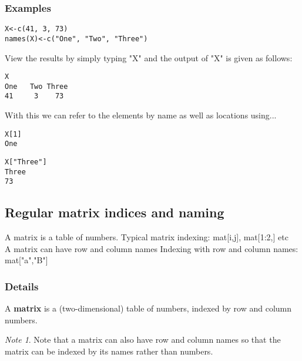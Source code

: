 \documentclass[12pt,a4paper]{article}
\theoremstyle{regla}
\theoremstyle{remark}
\newtheorem{notes}{Note}[section]
\theoremstyle{definition}
\theoremstyle{nonumberbreak}
\begin{document}
\subsubsection{Examples}
\begin{xmpl}
\begin{lstlisting}
X<-c(41, 3, 73)
names(X)<-c("One", "Two", "Three")
\end{lstlisting}

View the results by simply typing "X" and the output of "X" is given as follows:

\begin{lstlisting}
X
One   Two Three 
41     3    73
\end{lstlisting}

With this we can refer to the elements by name as well as locations using...

\begin{lstlisting}
X[1] 
One  
\end{lstlisting}

\begin{lstlisting}
X["Three"] 
Three  
73 
\end{lstlisting}

\end{xmpl}



\subsection{Regular matrix indices and naming}
\begin{fbox}
\begin{minipage}{0.97\textwidth}
A matrix is a table of numbers. 
Typical matrix indexing: mat[i,j], mat[1:2,] etc\\

A matrix can have row and column names
Indexing with row and column names: mat["a","B"]

\end{minipage}
\end{fbox}
\subsubsection{Details}
\begin{defn}
A {\bf matrix} is a (two-dimensional) table of numbers, indexed by row and column numbers.
\end{defn}
\begin{notes}
Note that a matrix can also have row and column names so that the matrix can be indexed by its names rather than numbers.
\end{notes}
\end{document}
